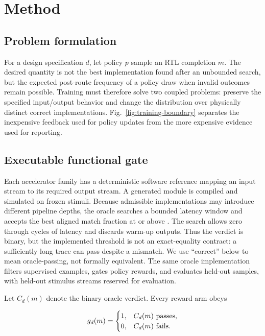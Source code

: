 \section{Method}
\label{sec:method}

\subsection{Problem formulation}

For a design specification $d$, let policy $p$ sample an RTL completion $m$.
The desired quantity is not the best implementation found after an unbounded
search, but the expected post-route frequency of a policy draw when invalid
outcomes remain possible.  Training must therefore solve two coupled problems:
preserve the specified input/output behavior and change the distribution over
physically distinct correct implementations.  Fig.~\ref{fig:training-boundary}
separates the inexpensive feedback used for policy updates from the more
expensive evidence used for reporting.

\subsection{Executable functional gate}

Each accelerator family has a deterministic software reference mapping an
input stream to its required output stream.  A generated module is compiled and
simulated on frozen stimuli.  Because admissible implementations may introduce
different pipeline depths, the oracle searches a bounded latency window and
accepts the best aligned match fraction at or above
.  The search allows zero through
 cycles of latency and discards
 warm-up outputs.  Thus the verdict is binary, but
the implemented threshold is not an exact-equality contract: a sufficiently
long trace can pass despite a mismatch.  We use ``correct'' below to mean
oracle-passing, not formally equivalent.  The same oracle implementation filters supervised examples, gates
policy rewards, and evaluates held-out samples, with held-out stimulus streams
reserved for evaluation.

Let $C_d(m)$ denote the binary oracle verdict.  Every reward arm obeys

\begin{equation}
g_d(m)=
\begin{cases}
1, & C_d(m)\text{ passes},\\
0, & C_d(m)\text{ fails}.
\end{cases}
\label{eq:gate}
\end{equation}

